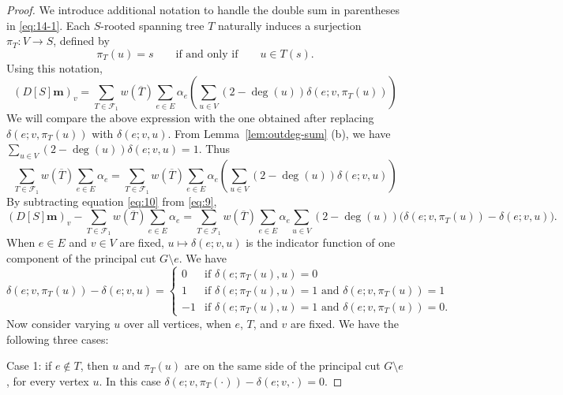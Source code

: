 \documentclass{amsart}
\theoremstyle{definition}
\newcommand{\boldm}{\mathbf{m}}
\newcommand{\trees}{\mathcal{F}_1}
\newcommand{\degout}{\deg^o}
\begin{document}
\begin{proof}
We introduce additional notation to handle the double sum in parentheses in \eqref{eq:14-1}.
Each $S$-rooted spanning tree $T$ naturally induces a surjection $\pi_T: V \to S$, defined by 
\[
	\pi_T(u) = s \qquad\text{if and only if}\qquad u \in T(s).
\]
Using this notation,
\begin{equation}
\label{eq:9}
	(D[S] \boldm)_v = \sum_{T \in \trees} w(\overline{T}) \sum_{e \in E} \alpha_e \left( \sum_{u \in V} (2 - \deg(u)) \delta(e; v,\pi_T(u)) \right)
\end{equation}
We will compare the above expression with the one obtained after replacing $\delta(e; v,\pi_T(u))$ with $\delta(e; v, u)$.
From Lemma~\ref{lem:outdeg-sum} (b), 
we have
$\displaystyle
	\sum_{u \in V} (2 - \deg(u)) \delta(e; v,u)
	= 1. 
$
Thus
\begin{equation}
\label{eq:10}
	\sum_{T \in \trees} w(\overline{T}) \sum_{e \in E} \alpha_e
	= \sum_{T \in \trees} w(\overline{T}) \sum_{e \in E} \alpha_e \left( \sum_{u \in V} (2 - \deg(u)) \delta(e; v,u) \right) 
\end{equation}
By subtracting equation \eqref{eq:10} from \eqref{eq:9},
\[
	(D[S] \boldm)_v - \sum_{T \in \trees} w(\overline{T}) \sum_{e \in E} \alpha_e 
	= \sum_{T \in \trees} w(\overline{T}) \sum_{e \in E} \alpha_e \sum_{u \in V} (2 - \deg(u)) \Big(\delta(e; v, \pi_T(u)) - \delta(e; v, u) \Big).
\]
When $e \in E$ and $v \in V$ are fixed, $u \mapsto \delta(e; v, u)$ is the indicator function of one component of the principal cut $G \setminus e$.
We have
\begin{equation}
\label{eq:delta-diff}
	\delta(e; v, \pi_T(u)) - \delta(e; v, u) = \begin{cases}
	0 &\text{if } \delta(e; \pi_T(u), u) = 0 \\
	1 &\text{if } \delta(e; \pi_T(u), u) = 1 \text{ and } \delta(e; v, \pi_T(u)) = 1 \\
	-1 &\text{if } \delta(e; \pi_T(u), u) = 1 \text{ and } \delta(e; v, \pi_T(u)) = 0 .
	\end{cases}
\end{equation}
Now consider varying $u$ over all vertices, when $e$, $T$, and $v$ are fixed.
We have the following three cases:

Case 1: if $e \not \in T$, then $u$ and $\pi_T(u)$ are on the same side of the principal cut $G \setminus e$, for every vertex $u$.
In this case $\delta(e;v, \pi_T(\cdot)) - \delta(e; v, \cdot) = 0$.


\end{proof}
\end{document}
